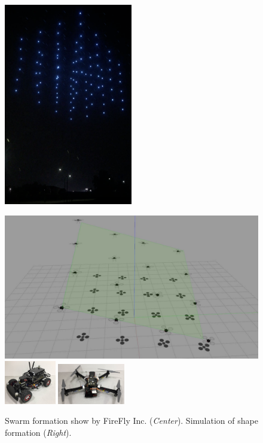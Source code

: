 \begin{figure}[h!]
\begin{minipage}{0.45\textwidth}
	\includegraphics[width=0.5\textwidth]{figs/firefly.png}	
\end{minipage}%
\begin{minipage}{0.45\textwidth}
	\includegraphics[width=.5\textwidth]{figs/shapeform_16.jpg}\\
	\includegraphics[width=0.2\textwidth]{figs/car.jpg}
	\includegraphics[width=0.26\textwidth]{figs/quad.jpg}
\end{minipage}%
	\caption{Swarm formation show by FireFly Inc. (\emph{Center}). Simulation of shape formation (\emph{Right}).}
    \label{fig:firefly}
\end{figure}

